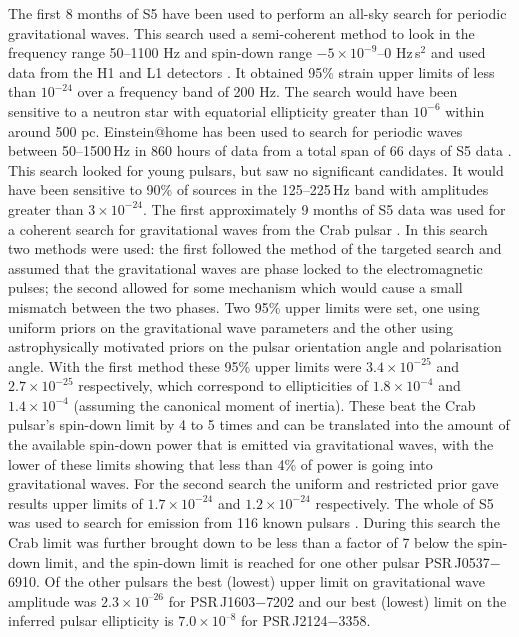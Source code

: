 \documentclass{article}
\begin{document}
The first 8 months of S5 have been used to perform an all-sky search for
periodic gravitational waves. This search used a semi-coherent method to look
in the frequency range 50--1100 Hz and spin-down range $-5\times10^{-9}$--0
Hz\,s$^2$ and used data from the H1 and L1 detectors \cite{Abbott:2008i}. It 
obtained 95\% strain upper limits of less than $10^{-24}$ over a
frequency band of 200 Hz. The search would have been sensitive to a neutron star
with equatorial ellipticity greater than $10^{-6}$ within around 500 pc.
Einstein@home \cite{eath} has been used to search for periodic waves between
50--1500\,Hz in 860 hours of data from a total span of 66 days of S5 data
\cite{Abbott:2009a}. This search looked for young pulsars, but saw no
significant candidates. It would have been sensitive to 90\% of sources in the
125--225\,Hz band with amplitudes greater than $3\times10^{-24}$. The first
approximately 9 months of S5 data was used for a coherent search for
gravitational waves from the Crab pulsar \cite{Abbott:2008j}. In this search two
methods were used: the first followed the method of the targeted search and
assumed that the gravitational waves are phase locked to the electromagnetic
pulses; the second allowed for some mechanism which would cause a small mismatch
between the two phases. Two 95\% upper limits were set, one using uniform priors
on the gravitational wave parameters and the other using astrophysically
motivated priors on the pulsar orientation angle and polarisation angle. With
the first method these 95\% upper limits were $3.4\times10^{-25}$ and
$2.7\times10^{-25}$ respectively, which correspond to ellipticities of
$1.8\times10^{-4}$ and $1.4\times10^{-4}$ (assuming the canonical moment of
inertia). These beat the Crab pulsar's spin-down limit by 4 to 5 times and can
be translated into the amount of the available spin-down power that is
emitted via gravitational waves, with the lower of these limits showing that less than 4\%
of power is going into gravitational waves. For the second search the uniform
and restricted prior gave results upper limits of $1.7\times10^{-24}$ and
$1.2\times10^{-24}$ respectively. The whole of S5 was used to search for
emission from 116 known pulsars \cite{Abbott:2010a}. During this search the
Crab limit was further brought down to be less than a factor of 7 below the 
spin-down limit, and the spin-down limit is reached for one other pulsar 
PSR\,J0537$-$6910. Of the other pulsars the best (lowest) upper limit on 
gravitational wave amplitude was $2.3\times10^{–26}$ for PSR\,J1603$-$7202 and 
our best (lowest) limit on the inferred pulsar ellipticity is $7.0\times10^{–8}$ 
for PSR\,J2124$-$3358.
\end{document}
